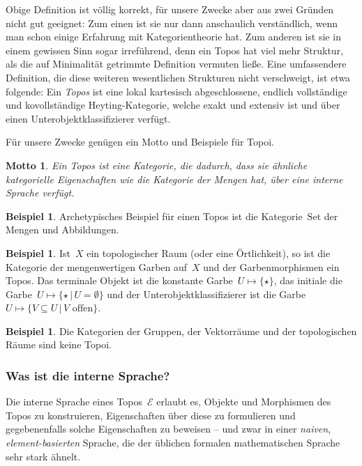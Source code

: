 \documentclass[a4paper,ngerman,12pt]{scrartcl}
\theoremstyle{definition}
\newtheorem{bsp}[defn]{Beispiel}
\theoremstyle{plain}
\newtheorem{motto}[defn]{Motto}
\theoremstyle{remark}
\newcommand{\E}{\mathcal{E}}
\newcommand{\Set}{\mathrm{Set}}
\renewcommand{\_}{\mathpunct{.}\,}
\newcommand{\?}{\,{:}\,}
\begin{document}
Obige Definition ist völlig korrekt, für unsere Zwecke aber aus zwei
Gründen nicht gut geeignet: Zum einen ist sie nur dann anschaulich
verständlich, wenn man schon einige Erfahrung mit Kategorientheorie hat. Zum
anderen ist sie in einem gewissen Sinn sogar irreführend, denn ein Topos hat
viel mehr Struktur, als die auf Minimalität getrimmte Definition vermuten ließe.
Eine umfassendere Definition, die diese weiteren wesentlichen Strukturen nicht
verschweigt, ist etwa folgende: Ein \emph{Topos} ist eine lokal kartesisch
abgeschlossene, endlich vollständige und kovollständige Heyting-Kategorie,
welche exakt und extensiv ist und über einen Unterobjektklassifizierer verfügt.

Für unsere Zwecke genügen ein Motto und Beispiele für Topoi.

\begin{motto}Ein Topos ist eine Kategorie, die dadurch, dass sie ähnliche
kategorielle Eigenschaften wie die Kategorie der Mengen hat, über eine
\emph{interne Sprache} verfügt.\end{motto}

\begin{bsp}Archetypisches Beispiel für einen Topos ist die Kategorie~$\Set$ der
Mengen und Abbildungen.
\end{bsp}

\begin{bsp}Ist~$X$ ein topologischer Raum (oder eine Örtlichkeit), so ist die
Kategorie der mengenwertigen Garben auf~$X$ und der Garbenmorphismen ein
Topos. Das terminale Objekt ist die konstante Garbe~$U \mapsto \{ \star \}$,
das initiale die Garbe~$U \mapsto \{ \star \,|\, U = \emptyset \}$ und der
Unterobjektklassifizierer ist die Garbe~$U \mapsto \{ V \subseteq U \,|\,
\text{$V$ offen} \}$.
\end{bsp}

\begin{bsp}Die Kategorien der Gruppen, der Vektorräume und der topologischen Räume sind
keine Topoi.\end{bsp}


\subsubsection*{Was ist die interne Sprache?}

Die interne Sprache eines Topos~$\E$ erlaubt es,
Objekte und Morphismen des Topos zu konstruieren,
Eigenschaften über diese zu formulieren und
gegebenenfalls solche Eigenschaften zu beweisen --
und zwar in einer \emph{naiven}, \emph{element-basierten} Sprache, die der
üblichen formalen mathematischen Sprache sehr stark ähnelt.
\end{document}

